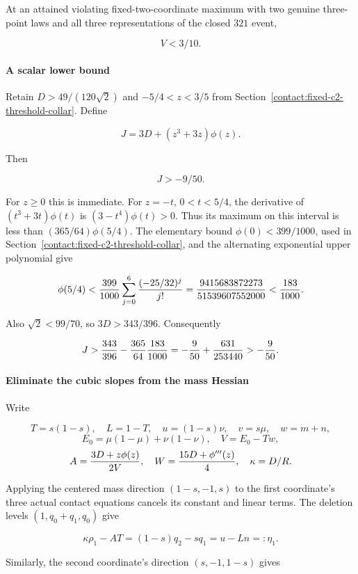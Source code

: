 At an attained violating fixed-two-coordinate maximum with two genuine
three-point laws and all three representations of the closed $321$ event,

\[
 \boxed{V<3/10.}
\tag{B.25.1}\label{contact:three-owner-321-variance-upper-1}
\]

\paragraph{A scalar lower bound}

Retain $D>49/(120\sqrt{2})$ and $-5/4<z<3/5$ from
Section~\ref{contact:fixed-c2-threshold-collar}. Define

\[
 J=3D+(z^3+3z)\phi(z).
\]

Then

\[
 \boxed{J>-9/50.}
\tag{B.25.2}\label{contact:three-owner-321-variance-upper-2}
\]

For $z\ge 0$ this is immediate. For $z=-t$, $0<t<5/4$, the derivative of
$(t^3+3t)\phi(t)$ is $(3-t^4)\phi(t)>0$. Thus its maximum on this interval
is less than $(365/64)\phi(5/4)$. The elementary bound $\phi(0)<399/1000$,
used in Section~\ref{contact:fixed-c2-threshold-collar}, and the alternating exponential
upper polynomial give

\[
 \phi(5/4)<{399\over1000}
 \sum_{j=0}^6{(-25/32)^j\over j!}
 ={9415683872273\over51539607552000}<{183\over1000}.
\]

Also $\sqrt{2}<99/70$, so $3D>343/396$. Consequently

\[
 J>{343\over396}-{365\over64}{183\over1000}
 =-{9\over50}+{631\over253440}>-{9\over50}.
\]

\paragraph{Eliminate the cubic slopes from the mass Hessian}

Write

\[
 T=s(1-s),\quad L=1-T,\quad
 u=(1-s)\nu,\quad v=s\mu,\quad w=m+n,
\]
\[
 E_0=\mu(1-\mu)+\nu(1-\nu),\quad V=E_0-Tw,
\]
\[
 A={3D+z\phi(z)\over2V},\quad
 W={15D+\phi'''(z)\over4},\quad \kappa=D/R.
\]

Applying the centered mass direction $(1-s,-1,s)$ to the first coordinate's
three actual contact equations cancels its constant and linear terms.
The deletion levels $(1,q_0+q_1,q_0)$ give

\[
 \kappa\rho_1-AT=(1-s)q_2-sq_1=u-Ln=:\eta_1.
\]

Similarly, the second coordinate's direction $(s,-1,1-s)$ gives

